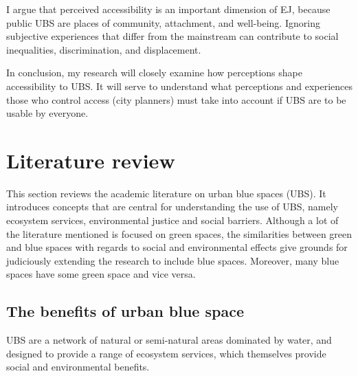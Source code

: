 \documentclass{article}
\begin{document}
I argue that perceived accessibility is an important dimension of EJ, because public UBS are places of community, attachment, and well-being. Ignoring subjective experiences that differ from the mainstream can contribute to social inequalities, discrimination, and displacement.

In conclusion, my research will closely examine how perceptions shape accessibility to UBS. It will serve to understand what perceptions and experiences those who control access (city planners) must take into account if UBS are to be usable by everyone.

\pagebreak
\section{Literature review}

This section reviews the academic literature on urban blue spaces (UBS). It introduces concepts that are central for understanding the use of UBS, namely ecosystem services, environmental justice and social barriers. Although a lot of the literature mentioned is focused on green spaces, the similarities between green and blue spaces with regards to social and environmental effects give grounds for judiciously extending the research to include blue spaces. Moreover, many blue spaces have some green space and vice versa.

\subsection{The benefits of urban blue space}


UBS are a network of natural or semi-natural areas dominated by water, and designed to provide a range of ecosystem services, which themselves provide social and environmental benefits.
\end{document}

